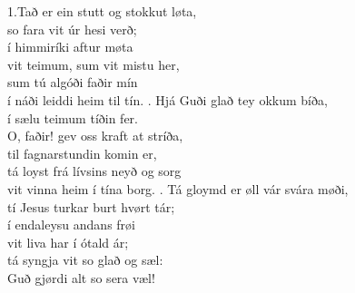 \begin{flushleft}
1.Tað er ein stutt og stokkut løta, \\
so fara vit úr hesi verð; \\
í himmiríki aftur møta \\
vit teimum, sum vit mistu her, \\
sum tú algóði faðir mín \\
í náði leiddi heim til tín. 
. Hjá Guði glað tey okkum bíða, \\
í sælu teimum tíðin fer. \\
O, faðir! gev oss kraft at stríða, \\
til fagnarstundin komin er, \\
tá loyst frá lívsins neyð og sorg \\
vit vinna heim í tína borg. 
. Tá gloymd er øll vár svára møði, \\
tí Jesus turkar burt hvørt tár; \\
í endaleysu andans frøi \\
vit liva har í ótald ár; \\
tá syngja vit so glað og sæl: \\
Guð gjørdi alt so sera væl!
\end{flushleft}
\newpage


